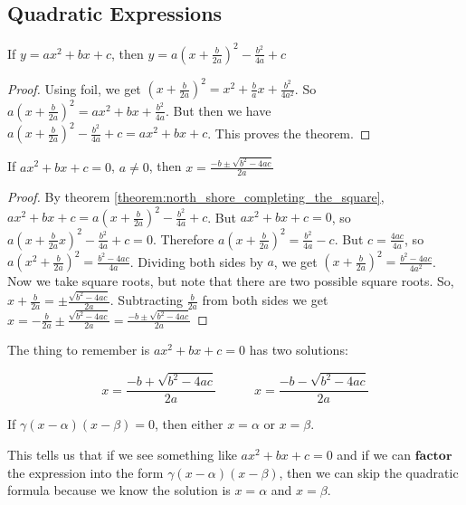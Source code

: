 \documentclass[../main.tex]{subfiles}
\begin{document}
\subsection{Quadratic Expressions}
%
\begin{theorem}
\label{theorem:north_shore_completing_the_square}
If $y = ax^2 +bx +c$, then $y = a(x+\frac{b}{2a})^2 - \frac{b^2}{4a}+c$
\end{theorem}
\begin{proof}
Using \gls{foil}, we get $(x+\frac{b}{2a})^2 = x^2 + \frac{b}{a}x + \frac{b^2}{4a^2}$. So $a(x+\frac{b}{2a})^2 = ax^2 + bx + \frac{b^2}{4a}$. But then we have $a(x+\frac{b}{2a})^2 - \frac{b^2}{4a} + c = ax^2 + bx +c$. This proves the theorem.
\end{proof}
%
\begin{theorem}
\label{theorem:north_shore_quadratic_formula_theorem}
If $ax^2 + bx + c = 0$, $a\ne 0$, then $x = \frac{-b\pm \sqrt{b^2 - 4ac}}{2a}$
\end{theorem}
\begin{proof}
By theorem \ref{theorem:north_shore_completing_the_square}, $ax^2 + bx + c = a(x+\frac{b}{2a})^2 - \frac{b^2}{4a} + c$. But $ax^2 + bx + c = 0$, so $a(x+\frac{b}{2a}x)^2 - \frac{b^2}{4a} + c = 0$. Therefore $a(x+\frac{b}{2a})^2 = \frac{b^2}{4a} - c$. But $c = \frac{4ac}{4a}$, so $a(x^2+\frac{b}{2a})^2 = \frac{b^2-4ac}{4a}$. Dividing both sides by $a$, we get $(x+\frac{b}{2a})^2 = \frac{b^2-4ac}{4a^2}$. Now we take square roots, but note that there are two possible square roots. So, $x+\frac{b}{2a} = \pm \frac{\sqrt{b^2 - 4ac}}{2a}$. Subtracting $\frac{b}{2a}$ from both sides we get $x = -\frac{b}{2a} \pm \frac{\sqrt{b^2-4ac}}{2a} = \frac{-b \pm \sqrt{b^2 - 4ac}}{2a}$
\end{proof}
%
\begin{remark}
The thing to remember is $ax^2 +bx +c = 0$ has two solutions:

\begin{equation*}
    x = \frac{-b + \sqrt{b^2 - 4ac}}{2a}
    \quad \quad \quad
    x = \frac{-b - \sqrt{b^2-4ac}}{2a}
\end{equation*}
\end{remark}
%
\begin{theorem}
\label{theorem:north_shore_zeros_of_a_factored_polynomial}
If $\gamma(x-\alpha)(x-\beta) = 0$, then either $x=\alpha$ or $x=\beta$.
\end{theorem}
%
\begin{remark}
This tells us that if we see something like $ax^2+bx+c = 0$ and if we can $\mathbf{factor}$ the expression into the form $\gamma(x-\alpha)(x-\beta)$, then we can skip the quadratic formula because we know the solution is $x = \alpha$ and $x=\beta$.
\end{remark}
%
\end{document}
